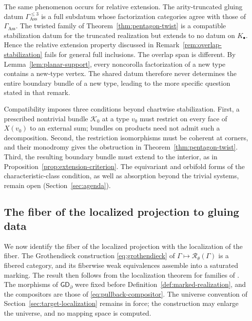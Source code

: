 \documentclass[11pt,letterpaper,twoside]{article}
\theoremstyle{plain}
\theoremstyle{definition}
\theoremstyle{remark}
\newcommand{\namecite}[2]{\citet{#2}}
\newcommand{\BGrm}{\mathsf{GD}_{\partial}}
\begin{document}
The same phenomenon occurs for relative extension.  The arity-truncated gluing datum \(\Gamma_{\mathrm{Ass}}^{\le3}\) is a full subdatum whose factorization categories agree with those of \(\Gamma_{\mathrm{Ass}}\).  The twisted family of Theorem~\ref{thm:pentagon-twist} is a compatible stabilization datum for the truncated realization but extends to no datum on \(K_\bullet\).  Hence the relative extension property discussed in Remark~\ref{rem:overlap-stabilization} fails for general full inclusions.  The overlap span is different.  By Lemma~\ref{lem:planar-support}, every noncorolla factorization of a new type contains a new-type vertex.  The shared datum therefore never determines the entire boundary bundle of a new type, leading to the more specific question stated in that remark.

Compatibility imposes three conditions beyond chartwise stabilization.  First, a prescribed nontrivial bundle \(\mathcal K_0\) at a type \(v_0\) must restrict on every face of \(X(v_0)\) to an external sum; bundles on products need not admit such a decomposition.  Second, the restriction isomorphisms must be coherent at corners, and their monodromy gives the obstruction in Theorem~\ref{thm:pentagon-twist}.  Third, the resulting boundary bundle must extend to the interior, as in Proposition~\ref{prop:extension-criterion}.  The equivariant and orbifold forms of the characteristic-class condition, as well as absorption beyond the trivial systems, remain open (Section~\ref{sec:agenda}).

\subsection{The fiber of the localized projection to gluing data}\label{sec:fiberwise-localization}

We now identify the fiber of the localized projection with the localization of the fiber.  The Grothendieck construction \eqref{eq:grothendieck} of \(\Gamma\mapsto\mathcal R_\theta(\Gamma)\) is a fibered category, and its fiberwise weak equivalences assemble into a saturated marking.  The result then follows from the localization theorem for families of \namecite{Hinich}{hinich2016}.  The morphisms of \(\BGrm\) were fixed before Definition~\ref{def:marked-realization}, and the compositors are those of \eqref{eq:pullback-compositor}.  The universe convention of Section~\ref{sec:target-localization} remains in force; the construction may enlarge the universe, and no mapping space is computed.
\end{document}
